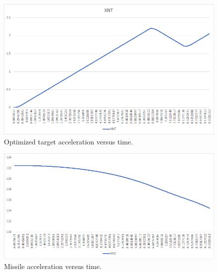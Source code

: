  \begin{figure}[H]
	\centering
	\includegraphics[scale = 0.70]{fig/XNT.PNG}
	\caption{Optimized target acceleration versus time.}
	\label{XNT}
\end{figure}

 \begin{figure}[H]
	\centering
	\includegraphics[scale = 0.70]{fig/XNC.PNG}
	\caption{Missile acceleration versus time.}
	\label{XNC}
\end{figure}

\afterpage{\blankpage}

